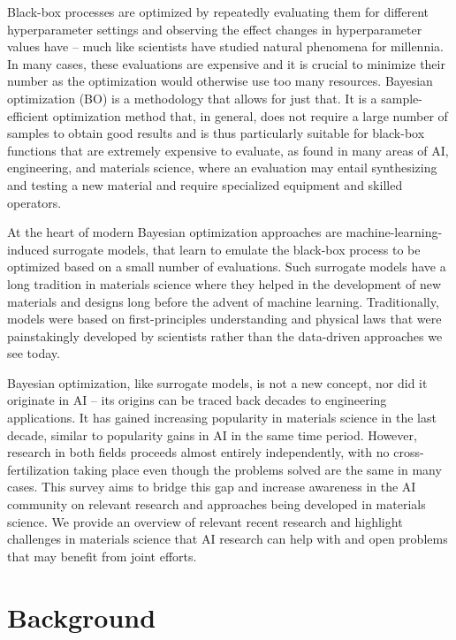 \documentclass{article}
\begin{document}
Black-box processes are optimized by repeatedly evaluating them for different
hyperparameter settings and observing the effect changes in hyperparameter
values have -- much like scientists have studied natural phenomena for
millennia. In many cases, these evaluations are expensive and it is crucial to
minimize their number as the optimization would otherwise use too many
resources. Bayesian optimization (BO) is a methodology that allows for just
that. It is a sample-efficient optimization method that, in general, does not
require a large number of samples to obtain good results and is thus
particularly suitable for black-box functions that are extremely expensive to
evaluate, as found in many areas of AI, engineering, and materials science,
where an evaluation may entail synthesizing and testing a new material and
require specialized equipment and skilled operators.

At the heart of modern Bayesian optimization approaches are
machine-learning-induced surrogate models, that learn to emulate the black-box
process to be optimized based on a small number of evaluations. Such surrogate
models have a long tradition in materials science where they helped in the
development of new materials and designs long before the advent of machine
learning. Traditionally, models were based on first-principles understanding and
physical laws that were painstakingly developed by scientists rather than the
data-driven approaches we see today.

Bayesian optimization, like surrogate models, is not a new concept, nor did it
originate in AI -- its origins can be traced back decades to engineering
applications. It has gained increasing popularity in materials science in the
last decade, similar to popularity gains in AI in the same time period. However,
research in both fields proceeds almost entirely independently, with no
cross-fertilization taking place even though the problems solved are the same in
many cases. This survey aims to bridge this gap and increase awareness in the AI
community on relevant research and approaches being developed in materials
science. We provide an overview of relevant recent research and highlight
challenges in materials science that AI research can help with and open problems
that may benefit from joint efforts.

\section{Background}
\end{document}
